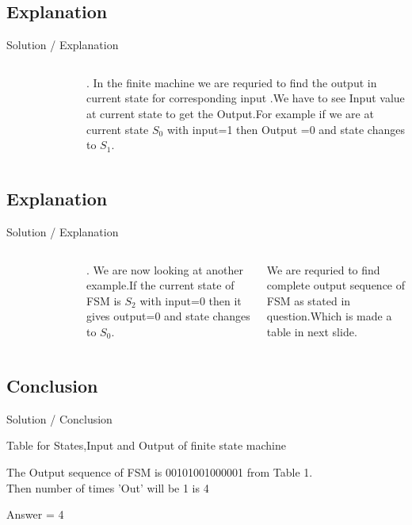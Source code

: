 \documentclass{beamer}
\begin{document}
\subsection{Explanation}
\begin{frame}{Solution / Explanation}
\begin{columns}
\vspace{-0.05cm} %
\begin{figure}[h]
    \scalebox{0.6}{
     }
    \label{fig:ques_}
\end{figure}.
In the finite machine we are requried to find the output in current state for corresponding input .We have to see Input value at current state to get the Output.For example if we are at current state $S_0$ with input=1 then Output =0 and state changes to $S_1$.
\end{columns}
\end{frame}

\subsection{Explanation}
\begin{frame}{Solution / Explanation}
\begin{columns}
\vspace{-0.05cm} %
\begin{figure}[h]
    \scalebox{0.6}{
     }
    \label{fig:ques_}
\end{figure}.
We are now looking at another example.If the current state of FSM is $S_2$ with input=0
then it gives output=0 and state changes to $S_0$.

We are requried to find complete output sequence of FSM as stated in question.Which is made a table in next slide.  

\end{columns}
\end{frame}
\subsection{Conclusion}
\begin{frame}{Solution / Conclusion}
    \begin{table}[h]
    \centering
    \scalebox{0.8}{
    }
    \caption{Table for States,Input and Output of finite state machine}
    \label{table}
\end{table}

The Output sequence of FSM is 00101001000001 from Table 1. \\
Then number of times 'Out' will be 1 is 4

\centering 
Answer = 4

\end{frame}
\end{document}
